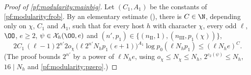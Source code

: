 \begin{proof}[Proof of \cref{pf:modularity:mainbig}]
Let $(C_1,A_1)$ be the constants of \cref{pf:modularity:frob}. By an elementary estimate
(), there is $C\in\N$, depending only on $\chi$, $C_1$ and
$A_1$, such that for every host $h$ with character $\chi$, every odd $\ell$, $\OO$, $e\ge2$, $\psi\in\mathcal X_h(\OO,e)$ and
$(n',p_1)\in\{(n_{\mathrm{II}},1),(n_{\mathrm{III}},p_1(\chi))\}$,
\begin{equation}\label{pf:modularity:arith}
2C_1\,(\ell-1)2^{n'}2o_\chi\,\bigl(\ell2^{n'}N_hp_1(e+1)\bigr)^{A_1}\log p_0(\ell N_hp_1)\le(\ell N_he)^C.
\end{equation}
(The proof bounds $2^{n'}$ by a power of $\ell N_he$, using $o_\chi\le N_\chi\le N_h$, $2^{c_2(\psi)}\le N_h$,
$16\mid N_h$ and \cref{pf:modularity:pzero}.)


\end{proof}
